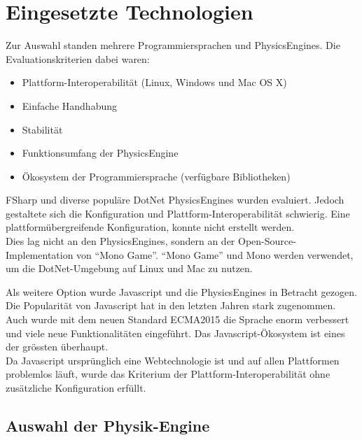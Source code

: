   \section{Eingesetzte Technologien\label{sec:Technology}}

    \begin{minipage}{\textwidth}

    Zur Auswahl standen mehrere Programmiersprachen und \glspl{PhysicsEngine}.
    Die Evaluationskriterien dabei waren:

    \begin{itemize}
      \item Plattform-Interoperabilität (Linux, Windows und Mac OS X)
      \item Einfache Handhabung
      \item Stabilität
      \item Funktionsumfang der \gls{PhysicsEngine}
      \item Ökosystem der Programmiersprache (verfügbare Bibliotheken)
    \end{itemize}

    \end{minipage}

    \bigskip
    \smallskip

    \gls{FSharp} und diverse populäre \gls{DotNet} \glspl{PhysicsEngine} wurden evaluiert.
    Jedoch gestaltete sich die Konfiguration und Plattform-Interoperabilität schwierig.
    Eine plattformübergreifende Konfiguration, konnte nicht erstellt werden.
    \\
    Dies lag nicht an den \glspl{PhysicsEngine}, sondern an der Open-Source-Implementation von ``Mono Game''.
    ``Mono Game'' und Mono werden verwendet, um die \gls{DotNet}-Umgebung auf Linux und Mac zu nutzen.

    \medskip

    Als weitere Option wurde Javascript und die \glspl{PhysicsEngine} in Betracht gezogen.
    Die Popularität von Javascript hat in den letzten Jahren stark zugenommen.
    Auch wurde mit dem neuen Standard ECMA2015 die Sprache enorm verbessert und viele neue Funktionalitäten eingeführt.
    Das Javascript-Ökosystem ist eines der grössten überhaupt.
    \\
    Da Javascript ursprünglich eine Webtechnologie ist und auf allen Plattformen problemlos läuft,
    wurde das Kriterium der Plattform-Interoperabilität ohne zusätzliche Konfiguration erfüllt.

    \subsection{Auswahl der Physik-Engine}

